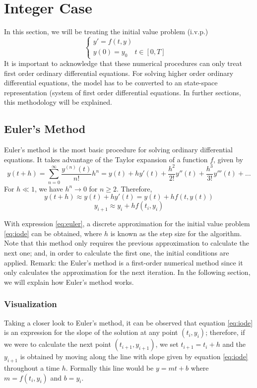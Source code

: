 \section{Integer Case}


In this section, we will be treating the initial value problem (i.v.p.)
\begin{equation}\label{eq:iode}
\begin{cases}
    y'= f(t,y)&\\ y(0)=y_0\quad t\in[0,T]&
\end{cases}
\end{equation}
It is important to acknowledge that these numerical procedures can only treat first order ordinary differential equations. For solving higher order ordinary differential equations, the model has to be converted to an state-space representation (system of first order differential equations. In further sections, this methodology will be explained.

\subsection{Euler's Method}\label{sec:euler}
Euler's method \cite{euler} is the most basic procedure for solving ordinary differential equations. It takes advantage of the Taylor expansion of a function $f$, given by
\begin{equation}
y(t+h)=\sum_{n=0}^{\infty}\dfrac{y^{(n)}(t)}{n!}h^n=y(t)+hy'(t)+\dfrac{h^2}{2!}y''(t)+\dfrac{h^3}{3!}y'''(t)+\dots
\end{equation}
For $h\ll1$, we have $h^n\rightarrow0$ for $n\geq2$. Therefore,
\[y(t+h)\approx y(t)+hy'(t)=y(t)+hf(t,y(t))\]
\begin{equation}\label{eq:euler}
    y_{i+1}\approx y_i+hf(t_i,y_i)
\end{equation}


With expression \eqref{eq:euler}, a discrete approximation for the initial value problem \eqref{eq:iode} can be obtained, where $h$ is known as the step size for the algorithm. Note that this method only requires the previous approximation to calculate the next one; and, in order to calculate the first one, the initial conditions are applied. Remark: the Euler's method is a first-order numerical method since it only calculates the approximation for the next iteration. In the following section, we will explain how Euler's method works.

\subsubsection{Visualization}
\noindent Taking a closer look to Euler's method, it can be observed that equation \eqref{eq:iode} is an expression for the slope of the solution at any point $(t_i,y_i)$; therefore, if we were to calculate the next point $(t_{i+1},y_{i+1})$, we set $t_{i+1}=t_i+h$ and the $y_{i+1}$ is obtained by moving along the line with slope given by equation \eqref{eq:iode} throughout a time $h$. Formally this line would be $y=mt+b$ where $m=f(t_i,y_i)$ and $b=y_i$.

